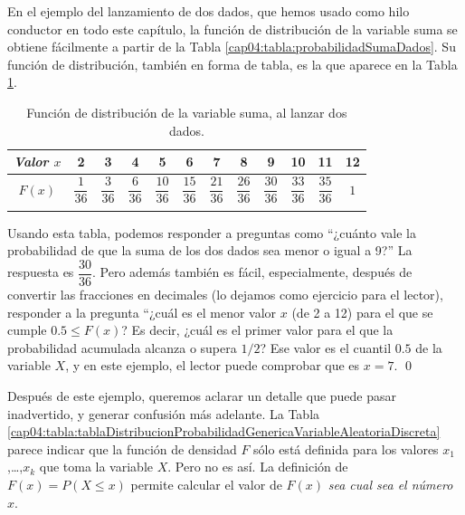 \begin{Ejemplo}
\label{cap04:ejem:TablaFuncionDistribucionDosDados}
    En el ejemplo del lanzamiento de dos dados, que hemos usado como hilo conductor en todo este capítulo, la función de distribución de la variable suma se obtiene fácilmente a partir de la Tabla \ref{cap04:tabla:probabilidadSumaDados}. Su función de distribución, también en forma de tabla, es la que aparece en la Tabla \ref{cap04:tabla:FuncionDistribucionSumaDados}.
    \begin{table}[ht]
    \begin{center}
    {\small
    \begin{tabular}[t]{|c|c|c|c|c|c|c|c|c|c|c|c|}
    \hline
    \rule{0cm}{0.7cm}{\em Valor $x$}
    &2&3&4&5&6&7&8&9&10&11&12\\
    \hline
    \rule{0cm}{1cm}$F(x)$
    &$\dfrac{1}{36}$&$\dfrac{3}{36}$&$\dfrac{6}{36}$&$\dfrac{10}{36}$&$\dfrac{15}{36}$&$\dfrac{21}{36}$&$\dfrac{26}{36}$&$\dfrac{30}{36}$&$\dfrac{33}{36}$&$\dfrac{35}{36}$&$1$\\
    &&&&&&&&&&&\\
    \hline
    \end{tabular}
    }
    \caption{Función de distribución de la variable suma, al lanzar dos dados.}\label{cap04:tabla:FuncionDistribucionSumaDados}
    \end{center}
    \end{table}
    Usando esta tabla, podemos responder a preguntas como ``¿cuánto vale la probabilidad de que la suma de los dos dados sea menor o igual a 9?'' La respuesta es $\dfrac{30}{36}$. Pero además también es fácil, especialmente, después de convertir las fracciones en decimales (lo dejamos como ejercicio para el lector), responder a la pregunta ``¿cuál es el menor valor $x$ (de 2 a 12) para el que se cumple $0.5\leq F(x)$? Es decir, ¿cuál es el primer valor para el que la probabilidad acumulada alcanza o supera $1/2$? Ese valor es el cuantil $0.5$ de la variable $X$, y en este ejemplo, el lector puede comprobar que es $x=7$.
    \qed
\end{Ejemplo}
Después de este ejemplo, queremos aclarar un detalle que puede pasar inadvertido, y generar confusión más adelante. La Tabla \ref{cap04:tabla:tablaDistribucionProbabilidadGenericaVariableAleatoriaDiscreta} parece indicar que la función de densidad $F$ sólo está definida para los valores $x_1$,\ldots,$x_k$ que toma la variable $X$. Pero no es así. La definición de $F(x)=P(X\leq x)$ permite calcular el valor de $F(x)$ {\em sea cual sea el número $x$}.
